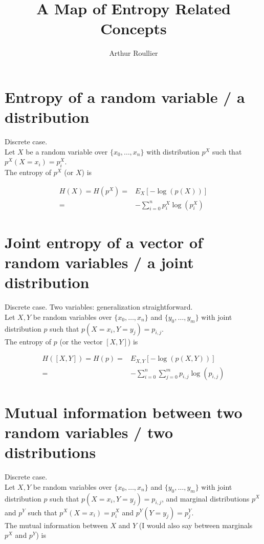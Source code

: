 \documentclass{article}
\title{A Map of Entropy Related Concepts}
\author{Arthur Roullier}
\begin{document}
\maketitle




\section{Entropy of a random variable / a distribution}
Discrete case.\\
Let $X$ be a random variable over $\{x_0, \dots, x_n\}$ with distribution $p^X$ such that $p^X(X=x_i) = p^X_i$.\\
The entropy of $p^X$ (or $X$) is

\begin{eqnarray*}
    H(X) = H(p^X) =& E_X[-\log(p(X))] \\
                =& - \sum_{i=0}^n p^X_i \log(p^X_i)
\end{eqnarray*}

\section{Joint entropy of a vector of random variables / a joint distribution}
Discrete case. Two variables: generalization straightforward. \\
Let $X,Y$ be  random variables over $\{x_0, \dots, x_n\}$ and $\{y_0, \dots, y_m\}$ with joint distribution $p$ such that $p(X=x_i,Y=y_j) = p_{i,j}$.\\
The entropy of $p$ (or the vector $[X,Y]$) is

\begin{eqnarray*}
    H([X,Y]) = H(p) =& E_{X,Y}[-\log(p(X,Y))] \\
                    =& - \sum_{i=0}^n \sum_{j=0}^m p_{i,j} \log(p_{i,j})
\end{eqnarray*}


\section{Mutual information between two random variables / two  distributions}
Discrete case.\\
Let $X,Y$ be  random variables over $\{x_0, \dots, x_n\}$ and $\{y_0, \dots, y_m\}$ with joint distribution $p$ such that $p(X=x_i,Y=y_j) = p_{i,j}$, and marginal distributions $p^X$ and $p^Y$ such that $p^X(X = x_i) = p^X_i$ and $p^Y(Y = y_j) = p^Y_j$.\\
The mutual information between $X$ and $Y$ (I would also say between marginals $p^X$ and $p^Y$) is
\end{document}
